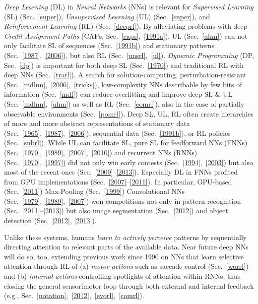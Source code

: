 \documentclass[letterpaper]{article}
\begin{document}
\begin{sloppypar}
{\em Deep Learning} (DL) in 
{\em Neural Networks} (NNs)
is relevant for
{\em Supervised Learning} (SL) (Sec.~\ref{super}),
{\em Unsupervised Learning} (UL) (Sec.~\ref{super}), and
{\em Reinforcement Learning} (RL) (Sec.~\ref{deeprl}).
By alleviating problems with deep {\em Credit Assignment Paths} (CAPs, Sec.~\ref{caps},~\ref{1991a}),
UL (Sec.~\ref{ulnn}) can not only facilitate 
SL of sequences  
(Sec.~\ref{1991b}) and 
stationary patterns
(Sec.~\ref{1987},~\ref{2006}), but also 
RL (Sec.~\ref{unsrl},~\ref{ul}). 
{\em Dynamic Programming} (DP, Sec.~\ref{dp}) is important for both 
deep SL (Sec.~\ref{1970})
and traditional RL with deep NNs (Sec.~\ref{trarl}).
A search for solution-computing, 
perturbation-resistant (Sec.~\ref{mdlnn},~\ref{2006},~\ref{tricks}),
low-complexity  NNs 
describable by few bits of information (Sec.~\ref{mdl}) can 
reduce overfitting and 
improve
deep SL \& UL (Sec.~\ref{mdlnn},~\ref{ulnn}) as well as RL (Sec.~\ref{comrl}),
also in the case of partially observable environments (Sec.~\ref{pomrl}). 
Deep SL, UL, RL often create hierarchies of more and more abstract  
representations of stationary data (Sec.~\ref{1965},~\ref{1987},~\ref{2006}),
sequential data (Sec.~\ref{1991b}), or RL policies (Sec.~\ref{subrl}). 
While UL can facilitate SL, pure SL for feedforward NNs (FNNs) (Sec.~\ref{1970},~\ref{1989},~\ref{2007},~\ref{2010})
and recurrent NNs (RNNs) (Sec.~\ref{1970},~\ref{1997})
did not only win early contests (Sec.~\ref{1994},~\ref{2003}) but also
most of the recent ones   
(Sec.~\ref{2009}--\ref{2013}).
Especially DL in FNNs profited from 
GPU implementations (Sec.~\ref{2007}--\ref{2011}).
In particular, 
GPU-based (Sec.~\ref{2011}) Max-Pooling (Sec.~\ref{1999}) Convolutional NNs (Sec.~\ref{1979},~\ref{1989},~\ref{2007})
won competitions not only in pattern recognition (Sec.~\ref{2011}--\ref{2013}) 
but also
image segmentation (Sec.~\ref{2012})
and object detection (Sec.~\ref{2012}, \ref{2013}).

Unlike these systems, humans {\em learn to actively perceive} patterns by sequentially directing attention to relevant parts of the available data. Near future deep NNs will do so, too, extending previous work since 1990 on NNs that learn selective attention through RL of (a) {\em motor actions} such as saccade control (Sec.~\ref{worrl}) and (b)  {\em internal actions} controlling spotlights of attention within RNNs, thus closing the general sensorimotor loop through both external and internal feedback (e.g., Sec.~\ref{notation},~\ref{2012},~\ref{evorl},~\ref{comrl}).


\end{sloppypar}
\end{document}
